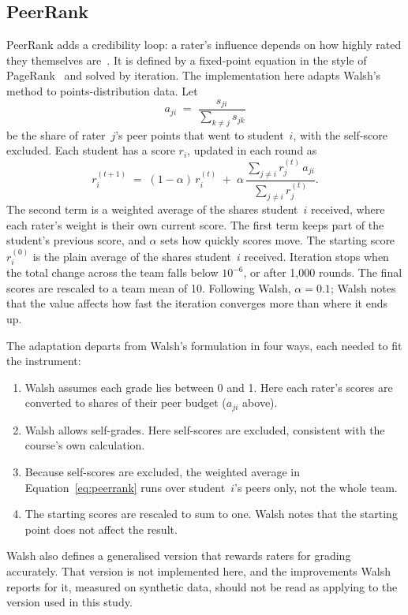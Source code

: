 \subsection{PeerRank}
\label{sec:peerrank-method}

PeerRank adds a credibility loop: a rater's influence depends on how highly
rated they themselves are~\citep{walsh2014peerrank}. It is defined by a
fixed-point equation in the style of PageRank~\citep{page1999pagerank} and
solved by iteration. The implementation here adapts Walsh's method to
points-distribution data. Let
\begin{equation}
  a_{ji} \;=\; \frac{s_{ji}}{\sum_{k \ne j} s_{jk}}
\end{equation}
be the share of rater~$j$'s peer points that went to student~$i$, with the
self-score excluded. Each student has a score $r_i$, updated in each round as
\begin{equation}
  r_i^{(t+1)} \;=\; (1-\alpha)\, r_i^{(t)}
    \;+\; \alpha \,
    \frac{\sum_{j \ne i} r_j^{(t)}\, a_{ji}}{\sum_{j \ne i} r_j^{(t)}}.
  \label{eq:peerrank}
\end{equation}
The second term is a weighted average of the shares student~$i$ received, where
each rater's weight is their own current score. The first term keeps part of
the student's previous score, and $\alpha$ sets how quickly scores move. The
starting score $r_i^{(0)}$ is the plain average of the shares student~$i$
received. Iteration stops when the total change across the team falls below
$10^{-6}$, or after 1{,}000 rounds. The final scores are rescaled to a team
mean of 10. Following Walsh, $\alpha = 0.1$; Walsh notes that the value affects
how fast the iteration converges more than where it ends up.

The adaptation departs from Walsh's formulation in four ways, each needed to fit
the instrument:
\begin{enumerate}
  \item Walsh assumes each grade lies between 0 and 1. Here each rater's scores
    are converted to shares of their peer budget ($a_{ji}$ above).
  \item Walsh allows self-grades. Here self-scores are excluded, consistent with
    the course's own calculation.
  \item Because self-scores are excluded, the weighted average in
    Equation~\ref{eq:peerrank} runs over student~$i$'s peers only, not the
    whole team.
  \item The starting scores are rescaled to sum to one. Walsh notes that the
    starting point does not affect the result.
\end{enumerate}
Walsh also defines a generalised version that rewards raters for grading
accurately. That version is not implemented here, and the improvements Walsh
reports for it, measured on synthetic data, should not be read as applying to
the version used in this study.

